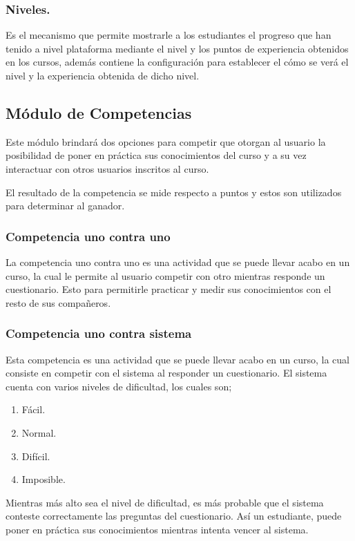 \subsubsection{Niveles.}

 Es el mecanismo que permite mostrarle a los estudiantes el progreso que han tenido
 a nivel plataforma mediante el nivel y los puntos de experiencia obtenidos en
 los cursos, además contiene la configuración para establecer el cómo se verá el
 nivel y la experiencia obtenida de dicho nivel.

%

\subsection{Módulo de Competencias}

  Este módulo brindará dos opciones para competir que otorgan al usuario
  la posibilidad de poner en práctica sus conocimientos del curso y a su vez interactuar
  con otros usuarios inscritos al curso.

  \noindent El resultado de la competencia se mide respecto a puntos y estos son utilizados para determinar al ganador.

\subsubsection{Competencia uno contra uno}


La competencia uno contra uno es una actividad que se puede llevar acabo en un curso, 
la cual le permite al usuario competir con otro mientras responde un cuestionario.
Esto para permitirle practicar y medir sus conocimientos con el resto de sus compañeros.\\

\subsubsection{Competencia uno contra sistema}

  Esta competencia es una actividad que se puede llevar acabo en un curso, la cual consiste en competir con el sistema al responder un cuestionario.
  El sistema cuenta con varios niveles de dificultad, los cuales son; \\
  \begin{enumerate}
    \item Fácil.
    \item Normal.
    \item Difícil.
    \item Imposible.
  \end{enumerate}
  \noindent Mientras más alto sea el nivel de dificultad, es más probable que el sistema conteste correctamente las preguntas del cuestionario. 
  Así un estudiante, puede poner en práctica sus conocimientos mientras intenta vencer al sistema.

